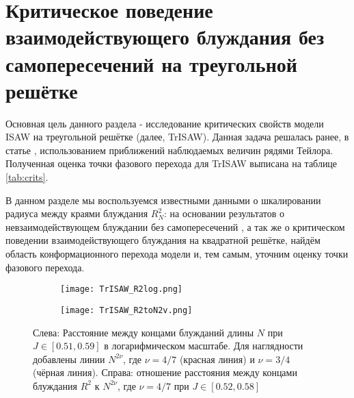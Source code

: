 \section{Критическое поведение взаимодействующего блуждания без самопересечений на треугольной решётке}

Основная цель данного раздела - исследование критических свойств модели ISAW на треугольной решётке (далее, TrISAW).
Данная задача решалась ранее, в статье \cite{Privman1986}, использованием приближений наблюдаемых величин рядями Тейлора.
Полученная оценка точки фазового перехода для TrISAW выписана на таблице \ref{tab:crits}.

В данном разделе мы воспользуемся известными данными о шкалировании радиуса между краями блуждания $R^2_N$:
на основании результатов о невзаимодействующем блуждании без самопересечений \cite{Rensburg2015}, а так же о критическом поведении взаимодействующего блуждания \cite{Duplantier1987} на квадратной решётке,
найдём область конформационного перехода модели и, тем самым, уточним оценку точки фазового перехода.
 

\begin{figure}[h]
\begin{subfigure}{0.49\textwidth}
\texttt{[image: TrISAW\_R2log.png]}
\caption{}
\label{fig:TrISAW_R2log}
\end{subfigure}
\hfill
\begin{subfigure}{0.49\textwidth}
\texttt{[image: TrISAW\_R2toN2v.png]}
\caption{}
\label{fig:TrISAW_R2toN2v}
\end{subfigure}
\caption{Слева: Расстояние между концами блужданий длины $N$ при $J \in [0.51,0.59]$ в логарифмическом масштабе. 
Для наглядности добавлены линии $N^{2\nu}$, где $\nu = 4/7$ (красная линия) и $\nu=3/4$ (чёрная линия).
Справа: отношение расстояния между концами блуждания $R^2$ к $N^{2\nu}$, где $\nu=4/7$ при $J \in [0.52,0.58]$}
\end{figure}